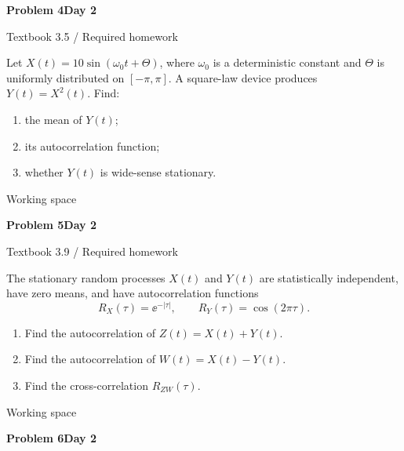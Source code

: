 \documentclass[11pt]{article}
\newcommand{\qtitle}[2]{\clearpage\begin{tcolorbox}[colback=navy,colframe=navy,arc=1.5pt,boxrule=0pt]\color{white}\large\bfseries #1\hfill\small #2\end{tcolorbox}}
\begin{document}
\qtitle{Problem 4}{Day 2}
{\small\color{accentred}Textbook 3.5 / Required homework}\par{}\par{}\par\smallskip\begin{tcolorbox}[colback=qbg,colframe=qbg,boxrule=0pt]Let $X(t)=10\sin(\omega_0t+\Theta)$, where $\omega_0$ is a deterministic constant and $\Theta$ is uniformly distributed on $[-\pi,\pi]$. A square-law device produces $Y(t)=X^2(t)$. Find:
\begin{enumerate}\item the mean of $Y(t)$;\item its autocorrelation function;\item whether $Y(t)$ is wide-sense stationary.\end{enumerate}\end{tcolorbox}\smallskip\begin{workspace}\hfill{\color{linec}\footnotesize Working space}\end{workspace}
\qtitle{Problem 5}{Day 2}
{\small\color{accentred}Textbook 3.9 / Required homework}\par{}\par{}\par\smallskip\begin{tcolorbox}[colback=qbg,colframe=qbg,boxrule=0pt]The stationary random processes $X(t)$ and $Y(t)$ are statistically independent, have zero means, and have autocorrelation functions
\[R_X(\tau)=\ee^{-|\tau|},\qquad R_Y(\tau)=\cos(2\pi\tau).\]
\begin{enumerate}\item Find the autocorrelation of $Z(t)=X(t)+Y(t)$.\item Find the autocorrelation of $W(t)=X(t)-Y(t)$.\item Find the cross-correlation $R_{ZW}(\tau)$.\end{enumerate}\end{tcolorbox}\smallskip\begin{workspace}\hfill{\color{linec}\footnotesize Working space}\end{workspace}
\qtitle{Problem 6}{Day 2}
\end{document}
